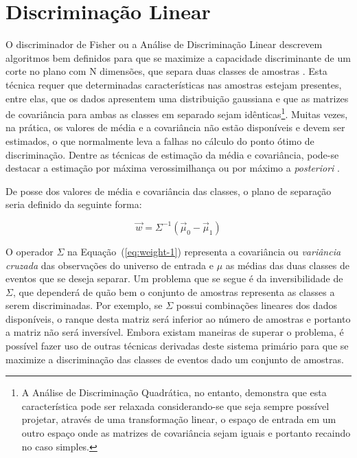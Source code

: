\section{Discriminação Linear}
\label{sec:lms}

O discriminador de Fisher \cite{fisher} ou a Análise de Discriminação Linear
descrevem algoritmos bem definidos para que se maximize a capacidade
discriminante de um corte no plano com N dimensões, que separa duas classes de
amostras \cite{duda}. Esta técnica requer que determinadas características nas
amostras estejam presentes, entre elas, que os dados apresentem uma
distribuição gaussiana e que as matrizes de covariância para ambas as classes
em separado sejam idênticas\footnote{A Análise de Discriminação Quadrática, no
entanto, demonstra que esta característica pode ser relaxada considerando-se
que seja sempre possível projetar, através de uma transformação linear, o
espaço de entrada em um outro espaço onde as matrizes de covariância sejam
iguais e portanto recaindo no caso simples.}. Muitas vezes, na prática, os
valores de média e a covariância não estão disponíveis e devem ser estimados,
o que normalmente leva a falhas no cálculo do ponto ótimo de
discriminação. Dentre as técnicas de estimação da média e covariância, pode-se
destacar a estimação por máxima verossimilhança ou por máximo a
\textit{posteriori} \cite{duda}.

De posse dos valores de média e covariância das classes, o plano de separação
seria definido da seguinte forma:

\begin{equation}
\overrightarrow{w} = \Sigma^{-1}(\overrightarrow{\mu}_0 -
\overrightarrow{\mu}_1) 
\label{eq:weight-1}
\end{equation}

O operador $\Sigma$ na Equação~(\ref{eq:weight-1}) representa a covariância ou
\textit{variância cruzada} das observações do universo de entrada e $\mu$ as
médias das duas classes de eventos que se deseja separar. Um problema que se
segue é da inversibilidade de $\Sigma$, que dependerá de quão bem o conjunto
de amostras representa as classes a serem discriminadas. Por exemplo, se
$\Sigma$ possui combinações lineares dos dados disponíveis, o ranque desta
matriz será inferior ao número de amostras e portanto a matriz não será
inversível. Embora existam maneiras de superar o problema, é possível fazer
uso de outras técnicas derivadas deste sistema primário para que se maximize a
discriminação das classes de eventos dado um conjunto de amostras.

